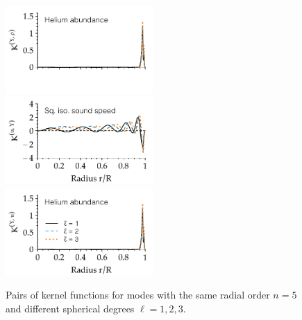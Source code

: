 \begin{figure}
    \includegraphics[width=0.5\textwidth,trim={0 1.1cm 0 0}, clip]{figs/pulse/kernels/kernel-ell-Y_rho-diffusion.pdf}\\
    \includegraphics[width=0.5\textwidth]{figs/pulse/kernels/kernel-ell-u_Y-diffusion.pdf}%
    \includegraphics[width=0.5\textwidth]{figs/pulse/kernels/kernel-ell-Y_u-diffusion.pdf}
    \caption[Kernel functions (same $n$, different $\ell$)]{Pairs of kernel functions for modes with the same radial order ${n=5}$ and different spherical degrees ${\ell=1},2,3$. \label{fig:same-n}}
\end{figure}%
